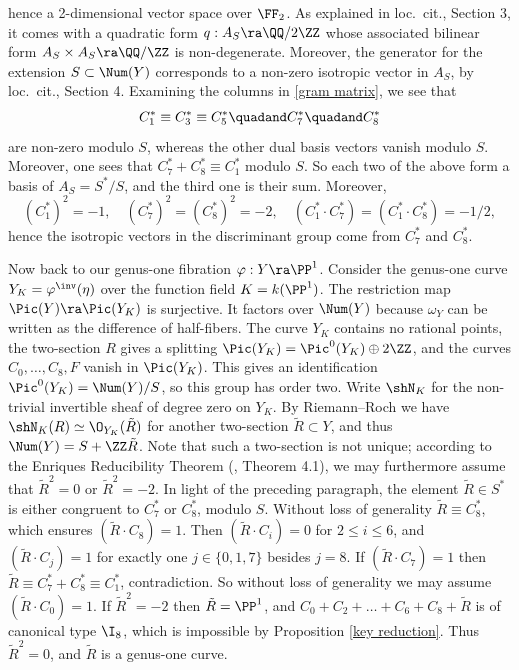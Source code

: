 hence a 2-dimensional vector space over $\FF_2$.
%
%
As explained in loc.\ cit., Section 3,
it comes with a  quadratic form $q:A_S\ra\QQ/2\ZZ$ whose associated bilinear form $A_S\times A_S\ra\QQ/\ZZ$ is non-degenerate.
Moreover, the generator for the extension $S\subset\Num(Y)$   corresponds  to a non-zero isotropic vector in $A_S$, by loc.\ cit., Section 4.
Examining the columns in  \eqref{gram matrix},  we see that
$$
C_1^*\equiv C_3^*\equiv C_5^*\quadand C_7^*\quadand C_8^*
$$
are non-zero modulo $S$, whereas the other dual basis vectors vanish modulo  $S$. Moreover, one sees that $C_7^*+C_8^*\equiv C^*_1$ modulo $S$.
So each two of the above  form a basis of $A_S=S^*/S$, and the third one is their sum. Moreover,
$$
(C_1^*)^2=-1,\quad (C_7^*)^2=(C_8^*)^2=-2,\quad (C_1^*\cdot C_7^*)=(C_1^*\cdot C_8^*)=-1/2,
$$
hence the isotropic vectors in the discriminant group come from $C_7^*$ and $C_8^*$.

\newcommand{\tR}{\tilde{R}}
Now back to our genus-one fibration $\varphi:Y\ra\PP^1$.
Consider the    genus-one curve $Y_K=\varphi^\inv(\eta)$ over the function field  $K=k(\PP^1)$.
The restriction map  $\Pic(Y)\ra\Pic(Y_K)$  is surjective. It factors over $\Num(Y)$  because
$\omega_Y$ can be written as the difference of half-fibers.
The curve $Y_K$ contains no rational points,   the two-section $R$ gives a splitting $\Pic(Y_K)=\Pic^0(Y_K)\oplus 2\ZZ$,
and the curves $C_0,\ldots,C_8,F$ vanish in $\Pic(Y_K)$. This gives an identification $\Pic^0(Y_K)=\Num(Y)/S$, so this group has order two.
Write $\shN_K$ for the non-trivial invertible sheaf of degree zero on $Y_K$.
By Riemann--Roch we have $\shN_K(R)\simeq\O_{Y_K}(\tR)$ for another  two-section $\tR\subset Y$, and thus  $\Num(Y)=S+\ZZ\tR$.
Note that such a  two-section is not unique;
according to the Enriques Reducibility Theorem (\cite{Lang-1983}, Theorem 4.1), we may furthermore assume that $\tR^2=0$ or $\tR^2=-2$.
In light of the preceding paragraph, the element $\tR\in S^*$
is either congruent  to $C_7^*$ or $C_8^*$, modulo $S$.
Without loss of generality $\tR\equiv C_8^*$, which ensures $(\tR\cdot C_8)=1$.
Then $(\tR\cdot C_i)=0$ for $2\leq i\leq 6$, and $(\tR\cdot C_j)=1$ for exactly one $j\in\{0,1,7\}$ besides $j=8$.
If $(\tR\cdot C_7)=1$ then $\tR\equiv C_7^*+C^*_8\equiv C_1^*$, contradiction.
So without loss of generality we may assume  $(\tR\cdot C_0)=1$.
If $\tR^2=-2$ then $\tR=\PP^1$, and  $C_0+C_2+\ldots+C_6+C_8+\tR$ is of canonical type $\I_8$, which is impossible by Proposition \ref{key reduction}.
Thus $\tR^2=0$, and $\tR$ is a genus-one curve.

